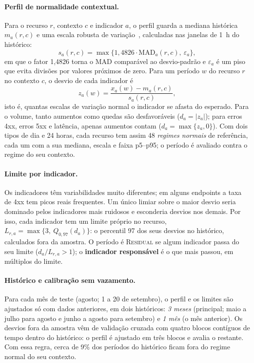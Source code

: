 \documentclass[sigconf,nonacm]{acmart}
\newcommand{\Residual}{\textsc{Residual}\xspace}
\begin{document}
\paragraph{Perfil de normalidade contextual.} Para o recurso $r$, contexto $c$ e indicador $a$, o perfil guarda a mediana histórica $m_a(r,c)$ e uma escala robusta de variação~\citep{leys2013mad}, calculadas nas janelas de 1~h do histórico:
\begin{equation}
  s_{a}(r,c)=\max\{1{,}4826\cdot\mathrm{MAD}_{a}(r,c),\ \varepsilon_a\},
\end{equation}
em que o fator 1,4826 torna o MAD comparável ao desvio-padrão e $\varepsilon_a$ é um piso que evita divisões por valores próximos de zero. Para um período $w$ do recurso $r$ no contexto $c$, o desvio de cada indicador é
\begin{equation}
  z_a(w)=\frac{x_a(w)-m_a(r,c)}{s_a(r,c)},
\end{equation}
isto é, quantas escalas de variação normal o indicador se afasta do esperado. Para o volume, tanto aumentos como quedas são desfavoráveis ($d_a=|z_a|$); para erros 4xx, erros 5xx e latência, apenas aumentos contam ($d_a=\max\{z_a,0\}$). Com dois tipos de dia e 24 horas, cada recurso tem assim 48 \emph{regimes normais} de referência, cada um com a sua mediana, escala e faixa p5--p95; o período é avaliado contra o regime do seu contexto.

\paragraph{Limite por indicador.} Os indicadores têm variabilidades muito diferentes; em alguns endpoints a taxa de 4xx tem picos reais frequentes. Um único limiar sobre o maior desvio seria dominado pelos indicadores mais ruidosos e esconderia desvios nos demais. Por isso, cada indicador tem um limite próprio no recurso, $L_{r,a}=\max\{3,\ Q_{0{,}97}(d_a)\}$: o percentil 97 dos seus desvios no histórico, calculados fora da amostra. O período é \Residual se algum indicador passa do seu limite ($d_a/L_{r,a}>1$); o \textbf{indicador responsável} é o que mais passou, em múltiplos do limite.

\paragraph{Histórico e calibração sem vazamento.} Para cada mês de teste (agosto; 1 a 20 de setembro), o perfil e os limites são ajustados só com dados anteriores, em dois históricos: \emph{3 meses} (principal; maio a julho para agosto e junho a agosto para setembro) e \emph{1 mês} (o mês anterior). Os desvios fora da amostra vêm de validação cruzada com quatro blocos contíguos de tempo dentro do histórico: o perfil é ajustado em três blocos e avalia o restante. Com essa regra, cerca de 9\% dos períodos do histórico ficam fora do regime normal do seu contexto.
\end{document}
